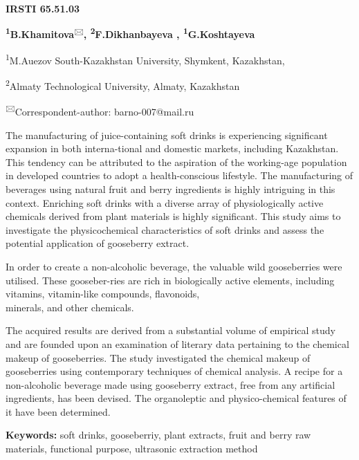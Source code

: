 \newpage
{\bfseries IRSTI 65.51.03}

\begin{center}

{\bfseries \textsuperscript{1}B.Khamitova}\textsuperscript{🖂}{\bfseries ,
\textsuperscript{2}F.Dikhanbayeva , \textsuperscript{1}G.Koshtayeva}

\textsuperscript{1}M.Auezov South-Kazakhstan University, Shymkent,
Kazakhstan,

\textsuperscript{2}Almaty Technological University, Almaty, Kazakhstan
\end{center}

\textsuperscript{🖂}Correspondent-author: barno-007@mail.ru\vspace{0.5cm}

The manufacturing of juice-containing soft drinks is experiencing
significant expansion in both interna-tional and domestic markets,
including Kazakhstan. This tendency can be attributed to the aspiration
of the working-age population in developed countries to adopt a
health-conscious lifestyle. The manufacturing of beverages using natural
fruit and berry ingredients is highly intriguing in this context.
Enriching soft drinks with a diverse array of physiologically active
chemicals derived from plant materials is highly significant. This study
aims to investigate the physicochemical characteristics of soft drinks
and assess the potential application of gooseberry extract.~

In order to create a non-alcoholic beverage, the valuable wild
gooseberries were utilised. These gooseber-ries are rich in biologically
active elements, including vitamins, vitamin-like compounds, flavonoids,
\\minerals, and other chemicals.~

The acquired results are derived from a substantial volume of empirical
study and are founded upon an examination of literary data pertaining to
the chemical makeup of gooseberries. The study investigated the chemical
makeup of gooseberries using contemporary techniques of chemical
analysis. A recipe for a non-alcoholic beverage made using gooseberry
extract, free from any artificial ingredients, has been devised. The
organoleptic and physico-chemical features of it have been determined.~

{\bfseries Keywords:} soft drinks, gooseberriy, plant extracts, fruit and
berry raw materials, functional purpose, ultrasonic extraction method

